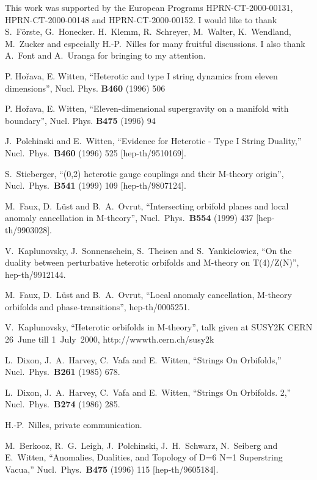 \documentclass[a4paper,12pt,twoside]{article}
\numberwithin{equation}{section}
\begin{document}
This work was supported by the European Programs HPRN-CT-2000-00131,
HPRN-CT-2000-00148 and HPRN-CT-2000-00152.  I would like to thank
S.~F\"orste, G.~Honecker. H.~Klemm, R.~Schreyer, M.~Walter,
K.~Wendland, M.~Zucker and especially H.-P.~Nilles for many fruitful
discussions. I also thank A.~Font and A.~Uranga for bringing
\cite{Aldazabal} to my attention.


\begin{thebibliography}{xx}
  
 P. Ho\v{r}ava, E. Witten, ``Heterotic and type I string
  dynamics from eleven dimensions'', Nucl. Phys. {\bf B460} (1996) 506
  
 P. Ho\v{r}ava, E. Witten, ``Eleven-dimensional
  supergravity on a manifold with boundary'', Nucl. Phys. {\bf B475}
  (1996) 94
  
 J.~Polchinski and E.~Witten, ``Evidence for
  Heterotic - Type I String Duality,'' Nucl.\ Phys.\ {\bf B460} (1996)
  525 [hep-th/9510169].
  
 S.~Stieberger, ``(0,2) heterotic gauge couplings
  and their M-theory origin'', Nucl.\ Phys.\ {\bf B541} (1999) 109
  [hep-th/9807124].
  
 M.~Faux, D.~L\"ust and B.~A.~Ovrut, ``Intersecting
  orbifold planes and local anomaly cancellation in M-theory'', Nucl.\ 
  Phys.\ {\bf B554} (1999) 437 [hep-th/9903028].
  
 V.~Kaplunovsky, J.~Sonnenschein, S.~Theisen and
  S.~Yankielowicz, ``On the duality between perturbative heterotic
  orbifolds and M-theory on T(4)/Z(N)'', hep-th/9912144.
  
 M.~Faux, D.~L\"ust and B.~A.~Ovrut, ``Local anomaly
  cancellation, M-theory orbifolds and phase-transitions'',
  hep-th/0005251.
  
 V.~Kaplunovsky, ``Heterotic orbifolds in
  M-theory'', talk given at SUSY2K CERN 26~June till 1~July~2000,
  http://wwwth.cern.ch/susy2k
  
 L.~Dixon, J.~A.~Harvey, C.~Vafa and E.~Witten,
  ``Strings On Orbifolds,'' Nucl.\ Phys.\ {\bf B261} (1985) 678.
  
 L.~Dixon, J.~A.~Harvey, C.~Vafa and E.~Witten,
  ``Strings On Orbifolds. 2,'' Nucl.\ Phys.\ {\bf B274} (1986) 285.

 H.-P.~Nilles, private communication.
  
 M.~Berkooz, R.~G.~Leigh, J.~Polchinski,
  J.~H.~Schwarz, N.~Seiberg and E.~Witten, ``Anomalies, Dualities, and
  Topology of D=6 N=1 Superstring Vacua,'' Nucl.\ Phys.\ {\bf B475}
  (1996) 115 [hep-th/9605184].
  

\end{thebibliography}
\end{document}
